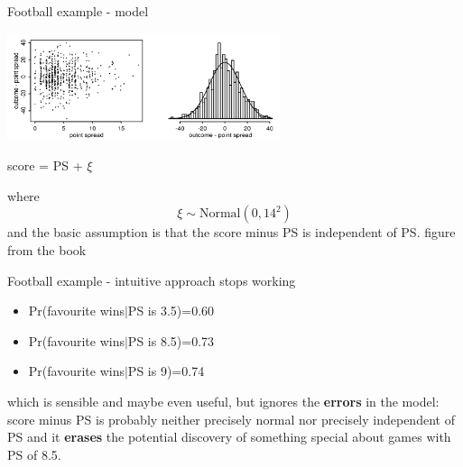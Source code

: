 \documentclass{beamer}
\newcommand{\cor}{\color{reddish}{}}
\newcommand{\cob}{\color{black}{}}
\begin{document}
\begin{frame}{Football example - model}

\begin{center}
    \includegraphics[width=8cm]{football_noise.png}
\end{center}
\cor
\begin{center} score = PS + $\xi$\end{center}
  \cob{}where\cor
  $$\xi\sim \mbox{Normal}(0,14^2)$$
  \cob
  and the basic assumption is that the \cor{}score minus PS\cob{} is independent of  \cor{}PS\cob.
  \vfill
\color{gray}figure from the book\cob
\end{frame}

\begin{frame}{Football example - intuitive approach stops working}
 
  \begin{itemize}
  \item \cor{}Pr(favourite wins$|$PS is 3.5)=0.60\cob
  \item \cor{}Pr(favourite wins$|$PS is 8.5)=0.73\cob
  \item \cor{}Pr(favourite wins$|$PS is 9)=0.74\cob
  \end{itemize}
  \vskip 0.75cm
  which is sensible and maybe even useful, but ignores the
\textbf{errors} in the model: \cor{}score minus PS\cob{} is probably neither
precisely normal nor precisely independent of \cor{}PS\cob{} and it
\textbf{erases} the potential discovery of something special about
games with PS of 8.5.
\end{frame}
\end{document}

